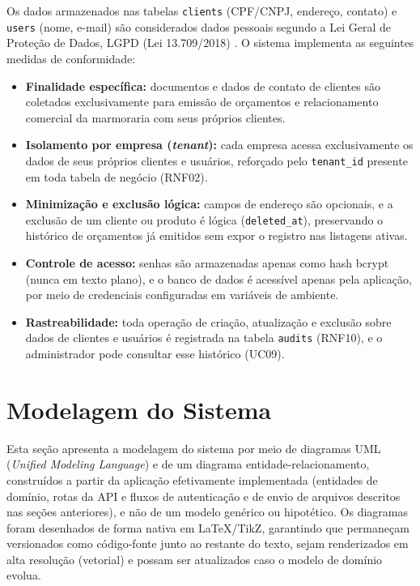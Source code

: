Os dados armazenados nas tabelas \texttt{clients} (CPF/CNPJ, endereço, contato) e \texttt{users} (nome, e-mail) são considerados dados pessoais segundo a Lei Geral de Proteção de Dados, LGPD (Lei 13.709/2018) \cite{lgpd2018}. O sistema implementa as seguintes medidas de conformidade:

\begin{itemize}
\item \textbf{Finalidade específica:} documentos e dados de contato de clientes são coletados exclusivamente para emissão de orçamentos e relacionamento comercial da marmoraria com seus próprios clientes.
\item \textbf{Isolamento por empresa (\textit{tenant}):} cada empresa acessa exclusivamente os dados de seus próprios clientes e usuários, reforçado pelo \texttt{tenant\_id} presente em toda tabela de negócio (RNF02).
\item \textbf{Minimização e exclusão lógica:} campos de endereço são opcionais, e a exclusão de um cliente ou produto é lógica (\texttt{deleted\_at}), preservando o histórico de orçamentos já emitidos sem expor o registro nas listagens ativas.
\item \textbf{Controle de acesso:} senhas são armazenadas apenas como hash bcrypt (nunca em texto plano), e o banco de dados é acessível apenas pela aplicação, por meio de credenciais configuradas em variáveis de ambiente.
\item \textbf{Rastreabilidade:} toda operação de criação, atualização e exclusão sobre dados de clientes e usuários é registrada na tabela \texttt{audits} (RNF10), e o administrador pode consultar esse histórico (UC09).
\end{itemize}

\section{Modelagem do Sistema}
\label{sec:modelagem-sistema}

Esta seção apresenta a modelagem do sistema por meio de diagramas UML (\textit{Unified Modeling Language}) e de um diagrama entidade-relacionamento, construídos a partir da aplicação efetivamente implementada (entidades de domínio, rotas da API e fluxos de autenticação e de envio de arquivos descritos nas seções anteriores), e não de um modelo genérico ou hipotético. Os diagramas foram desenhados de forma nativa em \LaTeX/TikZ, garantindo que permaneçam versionados como código-fonte junto ao restante do texto, sejam renderizados em alta resolução (vetorial) e possam ser atualizados caso o modelo de domínio evolua.

